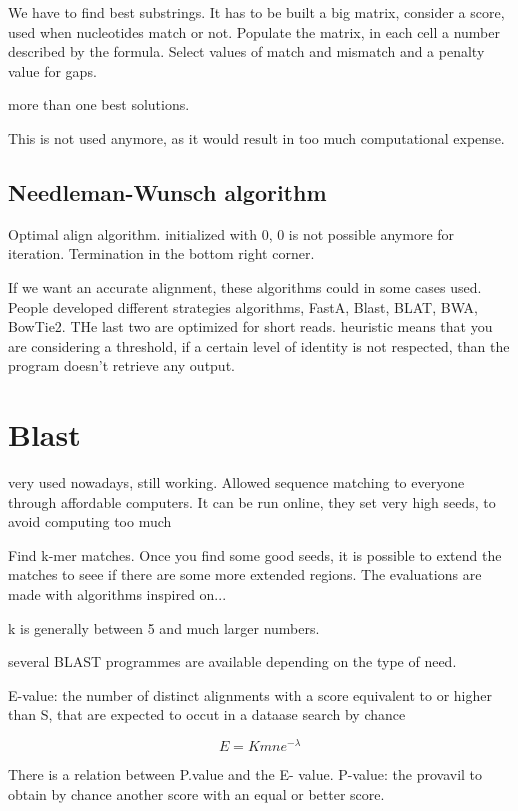 We have to find best substrings. It has to be built a big matrix, consider a score, used when nucleotides match or not. Populate the matrix, in each cell a number described by the formula. Select values of match and mismatch and a penalty value for gaps.

more than one best solutions.


This is not used anymore, as it would result in too much computational expense.

\subsection{Needleman-Wunsch algorithm}
Optimal align algorithm. initialized with 0, 0 is not possible anymore for iteration. Termination in the bottom right corner.

If we want an accurate alignment, these algorithms could in some cases used.  People developed different strategies algorithms, FastA, Blast, BLAT, BWA, BowTie2. THe last two are optimized for short reads. heuristic means that you are considering a threshold, if a certain level of identity is not respected, than the program doesn't retrieve any output.


\section{Blast}
very used nowadays, still working. Allowed sequence matching to everyone through affordable computers. It can be run online, they set very high seeds, to avoid computing too much

Find k-mer matches. Once you find some good seeds, it is possible to extend the matches to seee if there are some more extended regions. The evaluations are made with algorithms inspired on...

k is generally between 5 and much larger numbers.

several BLAST programmes are available depending on the type of need.

E-value: the number of distinct alignments with a score equivalent to or higher than S, that are expected to occut in a dataase search by chance

\begin{equation}
E = Kmne^{-\lambda}
\end{equation}

There is a relation between P.value and the E- value. P-value: the provavil to obtain by chance another score with an equal or better score.

